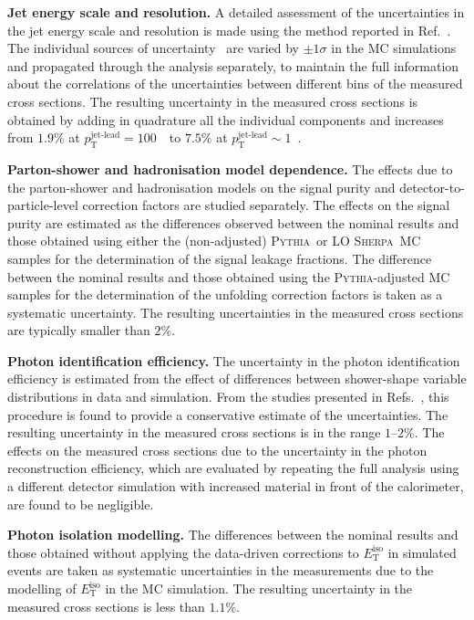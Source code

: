 \documentclass[cernpreprint,texlive=2016,txfonts,UKenglish]{latex/atlasdoc}
\def\ptjetl{p_{\mathrm{T}}^{\text{jet-lead}}}
\def\etiso{E_{\mathrm{T}}^{\mathrm{iso}}}
\def\sher{{\textsc{Sherpa}}}
\def\pyt{{\textsc{Pythia}}}
\begin{document}
{\textbf{Jet energy scale and resolution.}}
A detailed assessment of the uncertainties in the jet energy scale and
resolution is made using the method reported in
Ref.~\cite{pr:d96:072002}. The individual sources of
uncertainty~\cite{pr:d96:072002} are varied  by $\pm 1\sigma$ in the MC
simulations and propagated through the analysis separately, to
maintain the full information about the correlations of the
uncertainties between different bins of the measured cross
sections. The resulting uncertainty in the measured cross sections is
obtained by adding in quadrature all the individual components and
increases from $1.9\%$ at $\ptjetl=100$~\GeV\ to $7.5\%$ at
$\ptjetl\sim 1$~\TeV.

{\textbf{Parton-shower and hadronisation model dependence.}}
The effects due to the parton-shower and hadronisation models on the
signal purity and detector-to-particle-level correction factors are
studied separately. The effects on the signal purity are estimated as
the differences observed between the nominal results and those
obtained using either the (non-adjusted) \pyt\ or LO \sher\ MC samples
for the determination of the signal leakage fractions. The difference
between the nominal results and those obtained using the \pyt-adjusted
MC samples for the determination of the unfolding correction factors
is taken as a systematic uncertainty. The resulting uncertainties in
the measured cross sections are typically smaller than $2\%$.

{\textbf{Photon identification efficiency.}}
The uncertainty in the photon identification efficiency is estimated
from the effect of differences between shower-shape variable
distributions in data and simulation. From the studies presented in
Refs.~\cite{epj:c76:666,ATL-PHYS-PUB-2016-014}, this procedure is
found to provide a conservative estimate of the uncertainties. The
resulting uncertainty in the measured cross sections is in the range
$1$--$2\%$. The effects on the measured cross sections due to the
uncertainty in the photon reconstruction efficiency, which are
evaluated by repeating the full analysis using a different detector
simulation with increased material in front of the calorimeter, are
found to be negligible.

{\textbf{Photon isolation modelling.}}
The differences between the nominal results and those obtained without
applying the data-driven corrections to $\etiso$ in simulated events
are taken as systematic uncertainties in the measurements due to the
modelling of $\etiso$ in the MC simulation. The resulting uncertainty
in the measured cross sections is less than $1.1\%$.
\end{document}
